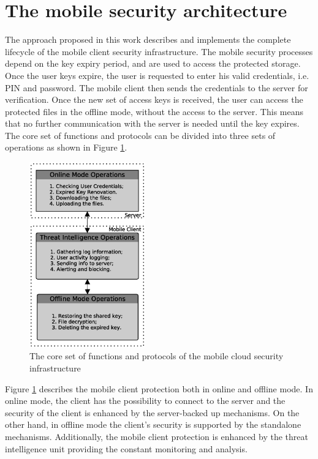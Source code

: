 \documentclass[twocolumn]{svjour3}          	%
\begin{document}
\section{The mobile security architecture}
\label{sec_the_client_security_architecture}
The approach proposed in this work describes and implements the complete lifecycle of the mobile client security infrastructure. The mobile security processes depend on the key expiry period, and are used to access the protected storage. Once the user keys expire, the user is requested to enter his valid credentials, i.e. PIN and password. The mobile client then sends the credentials to the server for verification. Once the new set of access keys is received, the user can access the protected files in the offline mode, without the access to the server. This means that no further communication with the server is needed until the key expires. The core set of functions and protocols can be divided into three sets of operations as shown in Figure \ref{fig:01}.

\begin{figure}[h!]
	\centering
	\includegraphics[width=5cm]{fig01.eps}
	\caption{The core set of functions and protocols of the mobile cloud security infrastructure}
	\label{fig:01}
\end{figure}

Figure \ref{fig:01} describes the mobile client protection both in online and offline mode. In online mode, the client has the possibility to connect to the server and the security of the client is enhanced by the server-backed up mechanisms. On the other hand, in offline mode the client’s security is supported by the standalone mechanisms. Additionally, the mobile client protection is enhanced by the threat intelligence unit providing the constant monitoring and analysis.
\end{document}
